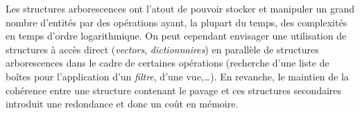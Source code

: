 Les structures arborescences ont l'atout de pouvoir stocker et manipuler un grand nombre d'entités par des opérations ayant, la plupart du temps, des complexités en temps d'ordre logarithmique. On peut cependant envisager une utilisation de structures à accès direct (\emph{vectors}, \emph{dictionnaires}) en parallèle de structures arborescences dans le cadre de certaines opérations (recherche d'une liste de boîtes pour l'application d'un \emph{filtre}, d'une vue,\dots{}). En revanche, le maintien de la cohérence entre une structure contenant le pavage et ces structures \og secondaires \fg{} introduit une redondance et donc un coût en mémoire.



